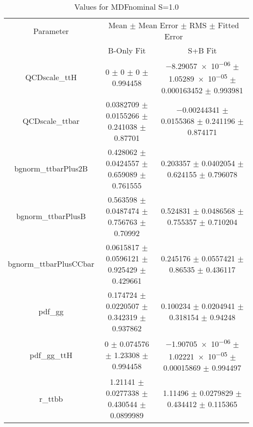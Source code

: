 \begin{table}
\centering
\caption{Values for MDFnominal S=1.0}
\begin{tabular}{ccc}
\toprule
Parameter & \multicolumn{2}{c}{Mean $\pm$ Mean Error $\pm$ RMS $\pm$ Fitted Error}\\
 & B-Only Fit & S+B Fit\\
\midrule
QCDscale\_ttH & \num{0} $\pm$ \num{0} $\pm$ \num{0} $\pm$ \num{0.994458} & \num{-8.29057e-06} $\pm$ \num{1.05289e-05} $\pm$ \num{0.000163452} $\pm$ \num{0.993981}\\
QCDscale\_ttbar & \num{0.0382709} $\pm$ \num{0.0155266} $\pm$ \num{0.241038} $\pm$ \num{0.87701} & \num{-0.00244341} $\pm$ \num{0.0155368} $\pm$ \num{0.241196} $\pm$ \num{0.874171}\\
bgnorm\_ttbarPlus2B & \num{0.428062} $\pm$ \num{0.0424557} $\pm$ \num{0.659089} $\pm$ \num{0.761555} & \num{0.203357} $\pm$ \num{0.0402054} $\pm$ \num{0.624155} $\pm$ \num{0.796078}\\
bgnorm\_ttbarPlusB & \num{0.563598} $\pm$ \num{0.0487474} $\pm$ \num{0.756763} $\pm$ \num{0.70992} & \num{0.524831} $\pm$ \num{0.0486568} $\pm$ \num{0.755357} $\pm$ \num{0.710204}\\
bgnorm\_ttbarPlusCCbar & \num{0.0615817} $\pm$ \num{0.0596121} $\pm$ \num{0.925429} $\pm$ \num{0.429661} & \num{0.245176} $\pm$ \num{0.0557421} $\pm$ \num{0.86535} $\pm$ \num{0.436117}\\
pdf\_gg & \num{0.174724} $\pm$ \num{0.0220507} $\pm$ \num{0.342319} $\pm$ \num{0.937862} & \num{0.100234} $\pm$ \num{0.0204941} $\pm$ \num{0.318154} $\pm$ \num{0.94248}\\
pdf\_gg\_ttH & \num{0} $\pm$ \num{0.074576} $\pm$ \num{1.23308} $\pm$ \num{0.994458} & \num{-1.90705e-06} $\pm$ \num{1.02221e-05} $\pm$ \num{0.00015869} $\pm$ \num{0.994497}\\
r\_ttbb & \num{1.21141} $\pm$ \num{0.0277338} $\pm$ \num{0.430544} $\pm$ \num{0.0899989} & \num{1.11496} $\pm$ \num{0.0279829} $\pm$ \num{0.434412} $\pm$ \num{0.115365}\\
\bottomrule
\end{tabular}
\end{table}